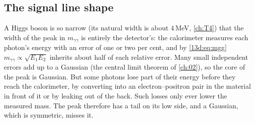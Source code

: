 \subsection{The signal line shape}
\label{13d:sec:signal-shape}

A Higgs boson is so narrow (its natural width is about $4\,$MeV, \cref{ch:T4}) that the
width of the peak in $m_{\gamma\gamma}$ is entirely the detector's: the calorimeter measures
each photon's energy with an error of one or two per cent, and by \eqref{13d:eq:mgg}
$m_{\gamma\gamma}\propto\sqrt{E_1E_2}$ inherits about half of each relative error. Many
small independent errors add up to a Gaussian (the central limit theorem of \cref{ch:02}),
so the core of the peak is Gaussian. But some photons lose part of their energy before they
reach the calorimeter, by converting into an electron--positron pair in the material in
front of it or by leaking out of the back. Such losses only ever lower the measured mass.
The peak therefore has a tail on its low side, and a Gaussian, which is symmetric, misses it.

